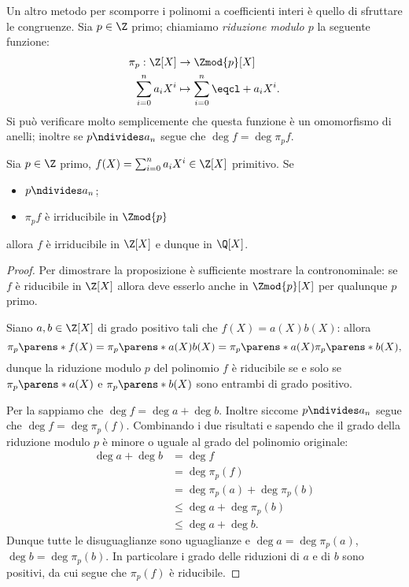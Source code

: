 Un altro metodo per scomporre i polinomi a coefficienti interi è quello di sfruttare le congruenze. Sia $p \in \Z$ primo; chiamiamo \emph{riduzione modulo $p$} la seguente funzione:
\begin{align*}
    \pi_p : \Z[X] &\to \Zmod{p}[X]\\
    \sum_{i=0}^n a_iX^i &\mapsto \sum_{i=0}^n \eqcl+{a_i}X^i.
\end{align*}
Si può verificare molto semplicemente che questa funzione è un omomorfismo di anelli; inoltre se $p \ndivides a_n$ segue che $\deg f = \deg \pi_p f$.

\begin{proposition}
    Sia $p \in \Z$ primo, $f(X) = \sum_{i=0}^n a_iX^i \in \Z[X]$ primitivo. Se \begin{itemize}
        \item $p \ndivides a_n$;
        \item $\pi_p f$ è irriducibile in $\Zmod{p}$
    \end{itemize} allora $f$ è irriducibile in $\Z[X]$ e dunque in $\Q[X]$.
\end{proposition}
\begin{proof}
    Per dimostrare la proposizione è sufficiente mostrare la contronominale: se $f$ è riducibile in $\Z[X]$ allora deve esserlo anche in $\Zmod{p}[X]$ per qualunque $p$ primo.

    Siano $a, b \in \Z[X]$ di grado positivo tali che $f(X) = a(X)b(X)$: allora \[
        \pi_p\parens*{f(X)} = \pi_p\parens*{a(X)b(X)} = \pi_p\parens*{a(X)}\pi_p\parens*{b(X)},
    \] dunque la riduzione modulo $p$ del polinomio $f$ è riducibile se e solo se $\pi_p\parens*{a(X)}$ e $\pi_p\parens*{b(X)}$ sono entrambi di grado positivo.

    Per la  sappiamo che $\deg f = \deg a + \deg b$. Inoltre siccome $p \ndivides a_n$ segue che $\deg f = \deg \pi_p(f)$. Combinando i due risultati e sapendo che il grado della riduzione modulo $p$ è minore o uguale al grado del polinomio originale: \begin{align*}
        \deg a + \deg b &= \deg f \\
        &= \deg \pi_p(f) \\
        &= \deg \pi_p(a) + \deg \pi_p(b)\\
        &\leq \deg a + \deg \pi_p(b) \\
        &\leq \deg a + \deg b.
    \end{align*} Dunque tutte le disuguaglianze sono uguaglianze e $\deg a = \deg \pi_p(a)$, $\deg b = \deg \pi_p(b)$. In particolare i grado delle riduzioni di $a$ e di $b$ sono positivi, da cui segue che $\pi_p(f)$ è riducibile.
\end{proof}

